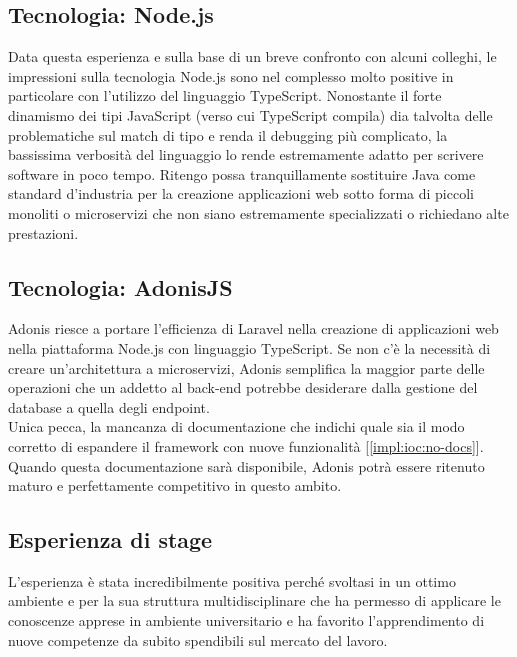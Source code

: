     \subsection{Tecnologia: Node.js}
    Data questa esperienza e sulla base di un breve confronto con alcuni colleghi, le impressioni sulla tecnologia Node.js sono nel complesso molto positive in particolare con l'utilizzo del linguaggio TypeScript. Nonostante il forte dinamismo dei tipi JavaScript (verso cui TypeScript compila) dia talvolta delle problematiche sul match di tipo e renda il debugging più complicato, la bassissima verbosità del linguaggio lo rende estremamente adatto per scrivere software in poco tempo. Ritengo possa tranquillamente sostituire Java come standard d'industria per la creazione applicazioni web sotto forma di piccoli monoliti o microservizi che non siano estremamente specializzati o richiedano alte prestazioni.

    \subsection{Tecnologia: AdonisJS}
    Adonis riesce a portare l'efficienza di Laravel nella creazione di applicazioni web nella piattaforma Node.js con linguaggio TypeScript. Se non c'è la necessità di creare un'architettura a microservizi, Adonis semplifica la maggior parte delle operazioni che un addetto al back-end potrebbe desiderare dalla gestione del database a quella degli endpoint.\\
    Unica pecca, la mancanza di documentazione che indichi quale sia il modo corretto di espandere il framework con nuove funzionalità [\autoref{impl:ioc:no-docs}]. Quando questa documentazione sarà disponibile, Adonis potrà essere ritenuto maturo e perfettamente competitivo in questo ambito.

    \subsection{Esperienza di stage}
    L'esperienza è stata incredibilmente positiva perché svoltasi in un ottimo ambiente e per la sua struttura multidisciplinare che ha permesso di applicare le conoscenze apprese in ambiente universitario e ha favorito l'apprendimento di nuove competenze da subito spendibili sul mercato del lavoro.